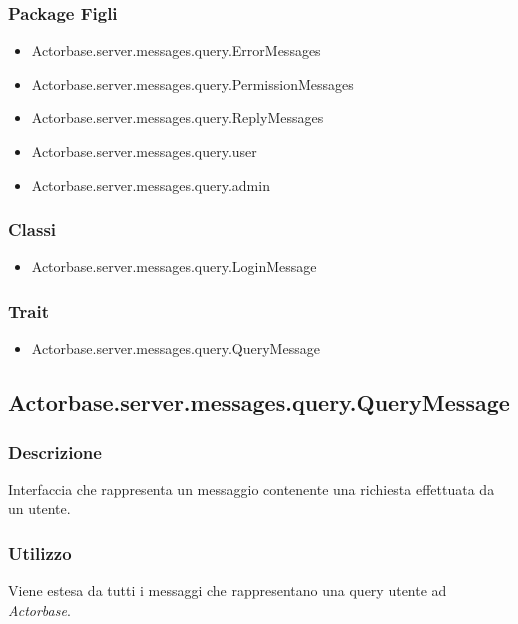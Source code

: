 \documentclass[a4paper]{article}
\begin{document}
			\subsubsection{Package Figli}
				\begin{itemize}
					\item Actorbase.server.messages.query.ErrorMessages
					\item Actorbase.server.messages.query.PermissionMessages
					\item Actorbase.server.messages.query.ReplyMessages
					\item Actorbase.server.messages.query.user
					\item Actorbase.server.messages.query.admin
				\end{itemize}
				
			\subsubsection{Classi}
				\begin{itemize}
					\item Actorbase.server.messages.query.LoginMessage
				\end{itemize}
				
			\subsubsection{Trait}
				\begin{itemize}
					\item Actorbase.server.messages.query.QueryMessage
				\end{itemize}

		\subsection{Actorbase.server.messages.query.QueryMessage}
		\label{QueryMessage}
			\subsubsection{Descrizione}
				Interfaccia che rappresenta un messaggio contenente una richiesta effettuata da un utente.
				
			\subsubsection{Utilizzo}
				Viene estesa da tutti i messaggi che rappresentano una query utente ad \emph{Actorbase}.
\end{document}
